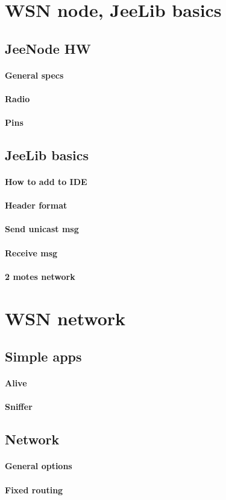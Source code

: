 \documentclass[12pt,titlepage]{article}
\begin{document}
\section{WSN node, JeeLib basics}
  
	\subsection{JeeNode HW }
		\paragraph{General specs}
		\paragraph{Radio}
		\paragraph{Pins}
	
	\subsection{JeeLib basics}
		\paragraph{How to add to IDE}
		\paragraph{Header format}
		\paragraph{Send unicast msg}
		\paragraph{Receive msg}
		\paragraph{2 motes network}
	
\section{WSN network}
	\subsection{Simple apps}
		\paragraph{Alive}
		\paragraph{Sniffer}
	 
	\subsection{Network}
		\paragraph{General options}
		\paragraph{Fixed routing}
	
\end{document}
